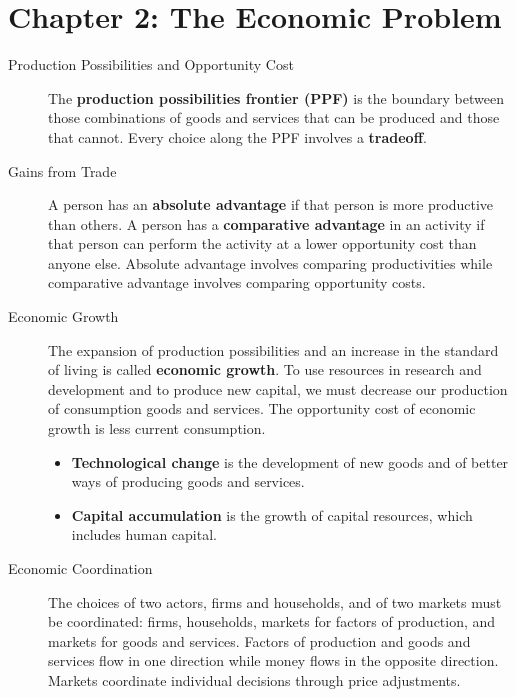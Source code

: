 \documentclass{article}
\begin{document}
\section*{Chapter 2: The Economic Problem}
\begin{description}
    \item [Production Possibilities and Opportunity Cost] The \textbf{production possibilities frontier (PPF)} is the boundary between those combinations of goods and services that can be produced and those that cannot. Every choice along the PPF involves a \textbf{tradeoff}.
    \item [Gains from Trade] A person has an \textbf{absolute advantage} if that person is more productive than others. A person has a \textbf{comparative advantage} in an activity if that person can perform the activity at a lower opportunity cost than anyone else. Absolute advantage involves comparing productivities while comparative advantage involves comparing opportunity costs.
    \item [Economic Growth] The expansion of production possibilities and an increase in the standard of living is called \textbf{economic growth}. To use resources in research and development and to produce new capital, we must decrease our production of consumption goods and services. The opportunity cost of economic growth is less current consumption.
    \begin{itemize}
        \item \textbf{Technological change} is the development of new goods and of better ways of producing goods and services.
        \item \textbf{Capital accumulation} is the growth of capital resources, which includes human capital.
    \end{itemize}
    \item [Economic Coordination] The choices of two actors, firms and households, and of two markets must be coordinated: firms, households, markets for factors of production, and markets for goods and services. Factors of production and goods and services flow in one direction while money flows in the opposite direction. Markets coordinate individual decisions through price adjustments.
\end{description}
\end{document}
